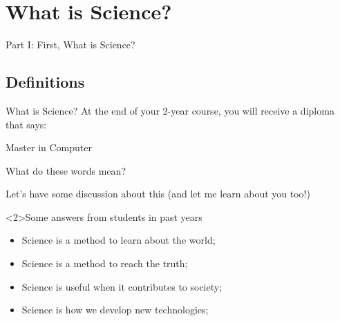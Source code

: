 \section{What is Science?}

\begin{frame}
  \begin{center}
    Part I: First, What is Science?
  \end{center}
\end{frame}

\subsection{Definitions}
\begin{frame}{What is Science?}
  At the end of your 2-year course, you will receive a diploma that says:
  \begin{center}
    Master in Computer 
  \end{center}
  What do these words mean?
  \medskip
  
  Let's have some discussion about this (and let me learn about you too!)
  \bigskip

  \begin{block}<2>{Some answers from students in past years}
    \begin{itemize}
      \item Science is a method to learn about the world;
      \item Science is a method to reach the truth;
      \item Science is useful when it contributes to society;
      \item Science is how we develop new technologies;
    \end{itemize}
  \end{block}\bigskip
\end{frame}

